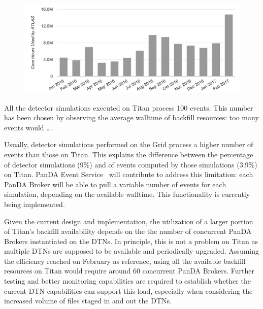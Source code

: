 \begin{figure}[htp]
    \includegraphics[clip,width=\columnwidth]{figures/cpu_hours.png}
\caption{}
\label{fig:hpc-workload-utilization}
\end{figure}

All the detector simulations executed on Titan process 100 events. This number
has been chosen by observing the average walltime of backfill resources: too
many events would \ldots{}.

Usually, detector simulations performed on the Grid process a higher number of
events than those on Titan. This explains the difference between the percentage
of detector simulations (9\%) and of events computed by those simulations
(3.9\%) on Titan. PanDA Event Service~\cite{panda-event-service} will contribute
to address this limitation: each PanDA Broker will be able to pull a variable
number of events for each simulation, depending on the available walltime. This
functionality is currently being implemented.

Given the current design and implementation, the utilization of a larger portion
of Titan's backfill availability depends on the the number of concurrent PanDA
Brokers instantiated on the DTNs.
In principle, this is not a problem on Titan as multiple DTNs are supposed to be
available and periodically upgraded. Assuming the efficiency reached on February
as reference, using all the available backfill resources on Titan would require
around 60 concurrent PanDA Brokers. Further testing and better monitoring
capabilities are required to establish whether the current DTN capabilities can
support this load, especially when considering the increased volume of files
staged in and out the DTNs.

